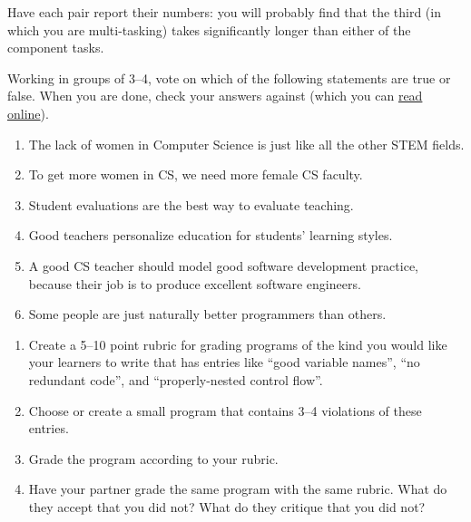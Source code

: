 Have each pair report their numbers: you will probably find that the
third (in which you are multi-tasking) takes significantly longer than
either of the component tasks.


Working in groups of 3--4, vote on which of the following statements
are true or false.  When you are done, check your answers against
\cite{Guzd2015b} (which you can
\href{https://cacm.acm.org/blogs/blog-cacm/189498-top-10-myths-about-teaching-computer-science/fulltext}{read
  online}).

\begin{enumerate}

\item The lack of women in Computer Science is just like all the other
  STEM fields.

\item To get more women in CS, we need more female CS faculty.

\item Student evaluations are the best way to evaluate teaching.

\item Good teachers personalize education for students' learning
  styles.

\item A good CS teacher should model good software development
  practice, because their job is to produce excellent software
  engineers.

\item Some people are just naturally better programmers than others.

\end{enumerate}


\begin{enumerate}

\item
  Create a 5--10 point rubric for grading programs of the kind you
  would like your learners to write that has entries like ``good
  variable names'', ``no redundant code'', and ``properly-nested
  control flow''.

\item
  Choose or create a small program that contains 3--4 violations of
  these entries.

\item
  Grade the program according to your rubric.

\item
  Have your partner grade the same program with the same rubric.  What
  do they accept that you did not?  What do they critique that you did
  not?

\end{enumerate}

